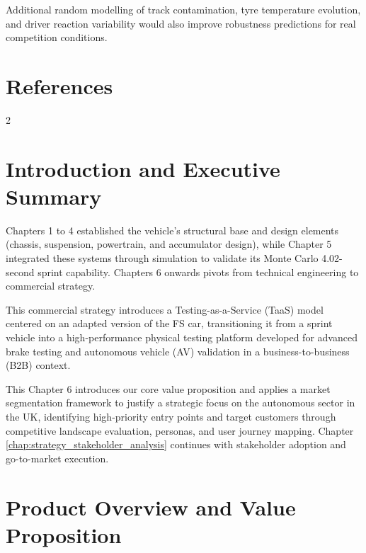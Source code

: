 \documentclass[11pt, a4paper]{report}
\numberwithin{equation}{section}
\newcommand{\compactbib}{%
  \vspace{-16pt}%
  \enlargethispage{20pt}%
  \section*{References}%
  \vspace{-33pt}%
  \begingroup
    \begin{singlespace}%
      \begin{multicols}{2}%
        \scriptsize
        \setlength{\bibitemsep}{0pt}%
        \printbibliography[heading=none]%
      \end{multicols}%
    \end{singlespace}%
  \endgroup
}
\begin{document}
\begin{refsection}
Additional random modelling of track contamination, tyre temperature evolution, and driver reaction variability would also improve robustness predictions for real competition conditions.

\compactbib

\end{refsection}


\begin{refsection}
\graphicspath{{../TobyMcConnell/Business/}}
\label{sec:market_and_competition}

\section{Introduction and Executive Summary}

Chapters 1 to 4 established the vehicle’s structural base and design elements (chassis, suspension, powertrain, and accumulator design), while Chapter 5 integrated these systems through simulation to validate its Monte Carlo 4.02-second sprint capability. Chapters 6 onwards pivots from technical engineering to commercial strategy.

This commercial strategy introduces a Testing-as-a-Service (TaaS) model centered on an adapted version of the FS car, transitioning it from a sprint vehicle into a high-performance physical testing platform developed for advanced brake testing and autonomous vehicle (AV) validation in a business-to-business (B2B) context.

This Chapter 6 introduces our core value proposition and applies a market segmentation framework to justify a strategic focus on the autonomous sector in the UK, identifying high-priority entry points and target customers through competitive landscape evaluation, personas, and user journey mapping. Chapter \ref{chap:strategy_stakeholder_analysis} continues with stakeholder adoption and go-to-market execution.

\section{Product Overview and Value Proposition}
\label{sec:value}


\end{refsection}
\end{document}
